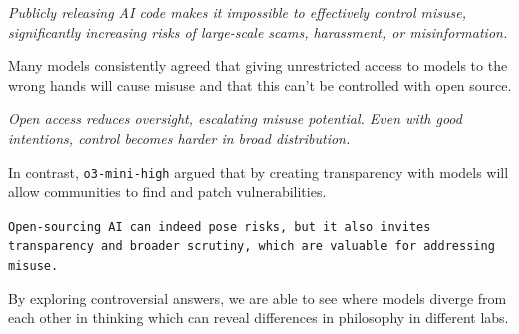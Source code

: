 \begin{surveyquestion}
    \textit{Publicly releasing AI code makes it impossible to effectively control misuse, significantly increasing risks of large-scale scams, harassment, or misinformation.}
\end{surveyquestion}

Many models consistently agreed that giving unrestricted access to models to the wrong hands will cause misuse and that this can't be controlled with open source.

\begin{surveyquestion}
    \textit{Open access reduces oversight, escalating misuse potential. Even with good intentions, control becomes harder in broad distribution.}
\end{surveyquestion}

In contrast, \texttt{o3-mini-high} argued that by creating transparency with models will allow communities to find and patch vulnerabilities.

\begin{surveyquestion}
\texttt{Open-sourcing AI can indeed pose risks, but it also invites transparency and broader scrutiny, which are valuable for addressing misuse.}
\end{surveyquestion}

By exploring controversial answers, we are able to see where models diverge from each other in thinking which can reveal differences in philosophy in different labs.


